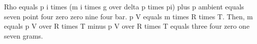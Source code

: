 Rho equals p i times (m i times g over delta p times pi) plus p ambient equals seven point four zero zero nine four bar. p V equals m times R times T. Then, m equals p V over R times T minus p V over R times T equals three four zero one seven grams.